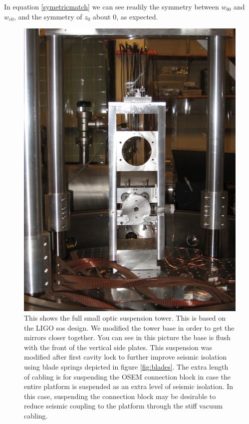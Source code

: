 In equation \ref{symetricmatch} we can see readily the symmetry between
$w_{b0}$ and $w_{c0}$, and the symmetry of $z_0$ about $0$, as expected.

\begin{figure}[h]
\centering
  \includegraphics[width=13cm]{./figures/susbig.jpg}
  \caption[Small Optic Suspension]{This shows the full small optic suspension
  tower.
  This is based on the LIGO \ac{sos} design.
  We modified the tower base in order to get the mirrors closer together.
  You can see in this picture the base is flush with the front of the
  vertical side plates.
  This suspension was modified after first cavity lock to further improve
  seismic isolation using blade springs depicted in figure \ref{fig:blades}.
  The extra length of cabling is for suspending the OSEM connection block
  in case the entire platform is suspended as an extra level of seismic
  isolation.
  In this case, suspending the connection block may be desirable to reduce
  seismic coupling to the platform through the stiff vacuum cabling.
  }
  \label{fig:susbig}
\end{figure}

